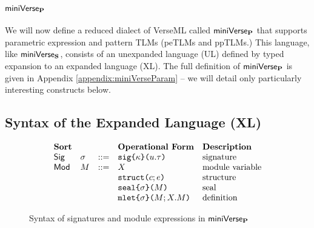 \vspace{-5px}
\section{\texorpdfstring{$\miniVerseParam$}{miniVerseP}}\label{sec:miniVerseP}
We will now define a reduced dialect of VerseML called $\miniVerseParam$ that supports parametric expression and pattern TLMs (peTLMs and ppTLMs.) This language, like $\mathsf{miniVerse}_\textbf{S}$, consists of an unexpanded language (UL) defined by typed expansion to an expanded language (XL). The full definition of $\miniVerseParam$ is given in Appendix \ref{appendix:miniVerseParam} -- we will detail only  particularly interesting constructs below.

\subsection{Syntax of the Expanded Language (XL)}\label{sec:P-expanded-terms}

\begin{figure}[p] 
\[\begin{array}{lllllll}
\textbf{Sort} & & & \textbf{Operational Form} 
& \textbf{Description}\\
\mathsf{Sig} & \sigma & ::= & \asignature{\kappa}{u}{\tau} 
& \text{signature}\\
\mathsf{Mod} & M & ::= & X 
& \text{module variable}\\
&&& \astruct{c}{e} 
& \text{structure}\\
&&& \aseal{\sigma}{M} 
& \text{seal}\\
&&& \amlet{\sigma}{M}{X}{M} %
& \text{definition}
\end{array}\]
\caption[Syntax of signatures and module expressions in $\miniVerseParam$]{Syntax of signatures and module expressions in $\miniVerseParam$}
\label{fig:P-modules-signatures}
\end{figure}


